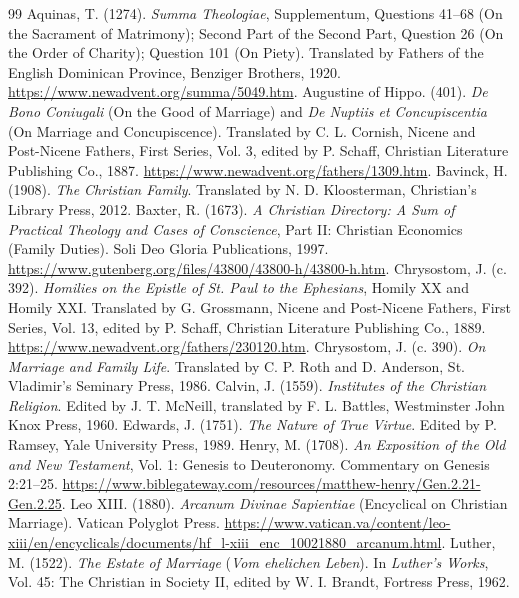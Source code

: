 \documentclass[11pt,twocolumn]{article}
\begin{document}
\begin{thebibliography}{99}
 Aquinas, T. (1274). \textit{Summa Theologiae}, Supplementum, Questions 41--68 (On the Sacrament of Matrimony); Second Part of the Second Part, Question 26 (On the Order of Charity); Question 101 (On Piety). Translated by Fathers of the English Dominican Province, Benziger Brothers, 1920. \url{https://www.newadvent.org/summa/5049.htm}.
 Augustine of Hippo. (401). \textit{De Bono Coniugali} (On the Good of Marriage) and \textit{De Nuptiis et Concupiscentia} (On Marriage and Concupiscence). Translated by C. L. Cornish, Nicene and Post-Nicene Fathers, First Series, Vol. 3, edited by P. Schaff, Christian Literature Publishing Co., 1887. \url{https://www.newadvent.org/fathers/1309.htm}.
 Bavinck, H. (1908). \textit{The Christian Family}. Translated by N. D. Kloosterman, Christian's Library Press, 2012.
 Baxter, R. (1673). \textit{A Christian Directory: A Sum of Practical Theology and Cases of Conscience}, Part II: Christian Economics (Family Duties). Soli Deo Gloria Publications, 1997. \url{https://www.gutenberg.org/files/43800/43800-h/43800-h.htm}.
 Chrysostom, J. (c. 392). \textit{Homilies on the Epistle of St. Paul to the Ephesians}, Homily XX and Homily XXI. Translated by G. Grossmann, Nicene and Post-Nicene Fathers, First Series, Vol. 13, edited by P. Schaff, Christian Literature Publishing Co., 1889. \url{https://www.newadvent.org/fathers/230120.htm}.
 Chrysostom, J. (c. 390). \textit{On Marriage and Family Life}. Translated by C. P. Roth and D. Anderson, St. Vladimir's Seminary Press, 1986.
 Calvin, J. (1559). \textit{Institutes of the Christian Religion}. Edited by J. T. McNeill, translated by F. L. Battles, Westminster John Knox Press, 1960.
 Edwards, J. (1751). \textit{The Nature of True Virtue}. Edited by P. Ramsey, Yale University Press, 1989.
 Henry, M. (1708). \textit{An Exposition of the Old and New Testament}, Vol. 1: Genesis to Deuteronomy. Commentary on Genesis 2:21--25. \url{https://www.biblegateway.com/resources/matthew-henry/Gen.2.21-Gen.2.25}.
 Leo XIII. (1880). \textit{Arcanum Divinae Sapientiae} (Encyclical on Christian Marriage). Vatican Polyglot Press. \url{https://www.vatican.va/content/leo-xiii/en/encyclicals/documents/hf_l-xiii_enc_10021880_arcanum.html}.
 Luther, M. (1522). \textit{The Estate of Marriage} (\textit{Vom ehelichen Leben}). In \textit{Luther's Works}, Vol. 45: The Christian in Society II, edited by W. I. Brandt, Fortress Press, 1962.

\end{thebibliography}
\end{document}
